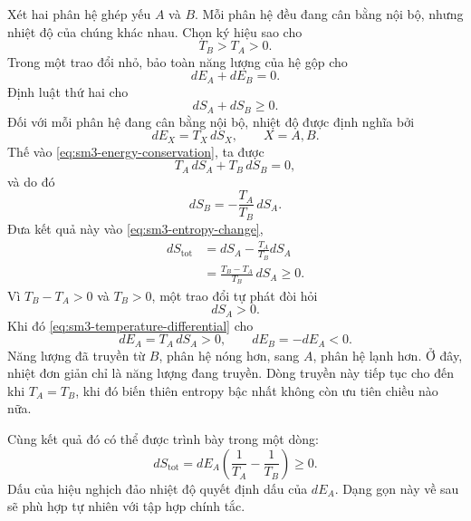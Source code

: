 Xét hai phân hệ ghép yếu \(A\) và \(B\). Mỗi phân hệ đều đang cân
bằng nội bộ, nhưng nhiệt độ của chúng khác nhau. Chọn ký hiệu sao cho
\begin{equation}
 T_B>T_A>0.
 \label{eq:sm3-temperature-order}
\end{equation}
Trong một trao đổi nhỏ, bảo toàn năng lượng của hệ gộp cho
\begin{equation}
 dE_A+dE_B=0.
 \label{eq:sm3-energy-conservation}
\end{equation}
Định luật thứ hai cho
\begin{equation}
 dS_A+dS_B\geq0.
 \label{eq:sm3-entropy-change}
\end{equation}
Đối với mỗi phân hệ đang cân bằng nội bộ, nhiệt độ được định nghĩa bởi
\begin{equation}
 dE_X=T_X\,dS_X,
 \qquad X=A,B.
 \label{eq:sm3-temperature-differential}
\end{equation}
Thế vào \eqref{eq:sm3-energy-conservation}, ta được
\begin{equation}
 T_A\,dS_A+T_B\,dS_B=0,
\end{equation}
và do đó
\begin{equation}
 dS_B=-\frac{T_A}{T_B}\,dS_A.
 \label{eq:sm3-dsb}
\end{equation}
Đưa kết quả này vào \eqref{eq:sm3-entropy-change},
\begin{align}
 dS_{\mathrm{tot}}
 &=dS_A-\frac{T_A}{T_B}dS_A\\
 &=\frac{T_B-T_A}{T_B}\,dS_A\geq0.
 \label{eq:sm3-flow-entropy}
\end{align}
Vì \(T_B-T_A>0\) và \(T_B>0\), một trao đổi tự phát đòi hỏi
\[
 dS_A>0.
\]
Khi đó \eqref{eq:sm3-temperature-differential} cho
\begin{equation}
 dE_A=T_A\,dS_A>0,
 \qquad
 dE_B=-dE_A<0.
 \label{eq:sm3-hot-to-cold}
\end{equation}
Năng lượng đã truyền từ \(B\), phân hệ nóng hơn, sang \(A\), phân hệ
lạnh hơn. Ở đây, nhiệt đơn giản chỉ là năng lượng đang truyền. Dòng truyền
này tiếp tục cho đến khi \(T_A=T_B\), khi đó biến thiên entropy bậc nhất không
còn ưu tiên chiều nào nữa.

Cùng kết quả đó có thể được trình bày trong một dòng:
\begin{equation}
 dS_{\mathrm{tot}}
 =dE_A\left(\frac{1}{T_A}-\frac{1}{T_B}\right)\geq0.
 \label{eq:sm3-compact-flow}
\end{equation}
Dấu của hiệu nghịch đảo nhiệt độ quyết định dấu của \(dE_A\). Dạng gọn này
về sau sẽ phù hợp tự nhiên với tập hợp chính tắc.


